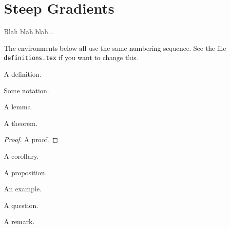 
\chapter{Steep Gradients}
\label{chp:SteepGradients}



Blah blah blah...

The environments below all use the same numbering sequence.  See
the file \verb+definitions.tex+ if you want to change this.

\begin{defn}
A definition.
\end{defn}

\begin{notn}
Some notation.
\end{notn}

\begin{lemma}
A lemma.
\end{lemma}

\begin{theorem}
A theorem.
\end{theorem}

\begin{proof}
A proof.
\end{proof}

\begin{cor}
A corollary.
\end{cor}

\begin{prop}
A proposition.
\end{prop}

\begin{ex}
An example.
\end{ex}

\begin{question}
A question.
\end{question}

\begin{remark}
A remark.
\end{remark}

